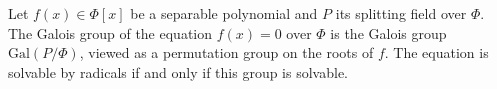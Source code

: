 Let $f(x) \in \Phi[x]$ be a separable polynomial and $P$ its splitting field over $\Phi$. The Galois group of the equation $f(x) = 0$ over $\Phi$ is the Galois group $\text{Gal}(P/\Phi)$, viewed as a permutation group on the roots of $f$. The equation is solvable by radicals if and only if this group is solvable.
